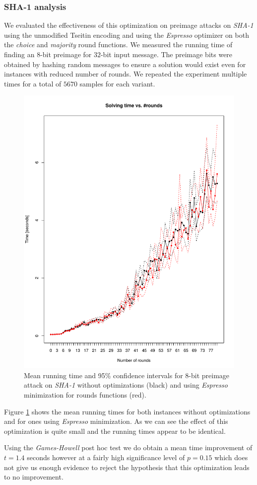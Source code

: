 \subsubsection{SHA-1 analysis}
We evaluated the effectiveness of this optimization on preimage attacks on \emph{SHA-1} using the unmodified Tseitin encoding and using the \emph{Espresso} optimizer on both the \emph{choice} and \emph{majority} round functions.
We measured the running time of finding an $8$-bit preimage for $32$-bit input message.
The preimage bits were obtained by hashing random messages to ensure a solution would exist even for instances with reduced number of rounds.
We repeated the experiment multiple times for a total of $5670$ samples for each variant.

\begin{figure}
\centering \includegraphics[width=.5\textwidth]{figures/opt-sha1/sha1-32bit-8bitref-cmp-espresso.pdf}
\caption{Mean running time and 95\% confidence intervals for $8$-bit preimage attack on \emph{SHA-1} without optimizations (black) and using \emph{Espresso} minimization for rounds functions (red).}
\label{fig:opt-sha1-cmp-espresso}
\end{figure}
 
Figure \ref{fig:opt-sha1-cmp-espresso} shows the mean running times for both instances without optimizations and for ones using \emph{Espresso} minimization.
As we can see the effect of this optimization is quite small and the running times appear to be identical.


Using the \emph{Games-Howell} post hoc test we do obtain a mean time improvement of $t=1.4$ seconds however at a fairly high significance level of $p=0.15$ which does not give us enough evidence to reject the hypothesis that this optimization leads to no improvement.

